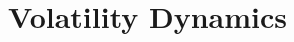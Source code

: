 \documentclass[twoside,11pt]{article}
\newcommand{\ngx}{\textsc{ngx}}
\begin{document}
%	
%	
%	

	\section{Volatility Dynamics}
	\label{sec:vol}
	
\end{document}
